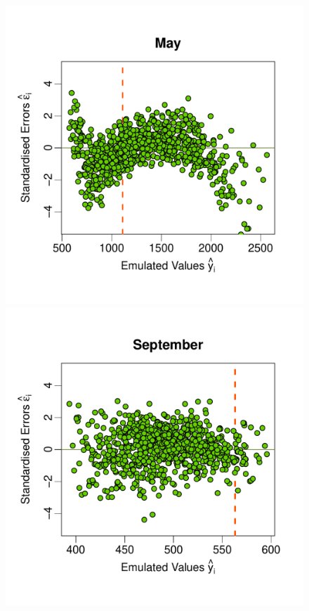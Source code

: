 \documentclass[a4paper, 12pt]{article}
\begin{document}
\begin{figure}
 \includegraphics[width=\scale]{Validation_Plots/Test_Set/Test_Scatter_05_May}\hspace{-1ex}
 \includegraphics[width=\scale]{Validation_Plots/Test_Set/Test_Scatter_09_Sep}\\[-3ex]

\end{figure}
\end{document}
